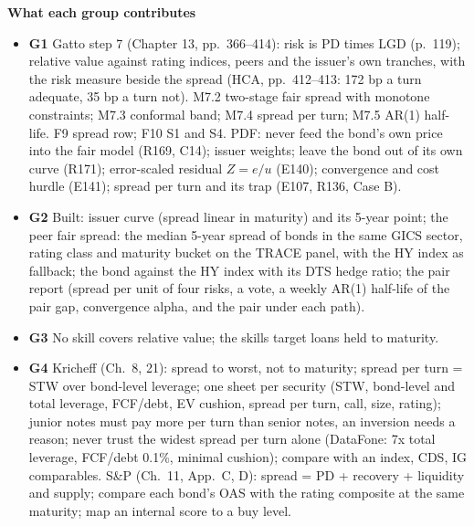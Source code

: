 \documentclass[11pt]{article}
\newcommand{\GA}{\textcolor{gA}{\textbf{G1}}}
\newcommand{\GB}{\textcolor{gB}{\textbf{G2}}}
\newcommand{\GC}{\textcolor{gC}{\textbf{G3}}}
\newcommand{\GD}{\textcolor{gD}{\textbf{G4}}}
\newcommand{\fld}[1]{\par\medskip\noindent\textbf{\textcolor{steel}{#1}}\par\nopagebreak}
\begin{document}
\fld{What each group contributes}
\begin{itemize}
\item \GA{} Gatto step 7 (Chapter 13, pp.~366--414): risk is PD times LGD (p.~119); relative value against rating indices, peers and the issuer's own tranches, with the risk measure beside the spread (HCA, pp.~412--413: 172 bp a turn adequate, 35 bp a turn not). M7.2 two-stage fair spread with monotone constraints; M7.3 conformal band; M7.4 spread per turn; M7.5 AR(1) half-life. F9 spread row; F10 S1 and S4. PDF: never feed the bond's own price into the fair model (R169, C14); issuer weights; leave the bond out of its own curve (R171); error-scaled residual $Z = e/u$ (E140); convergence and cost hurdle (E141); spread per turn and its trap (E107, R136, Case B).
\item \GB{} Built: issuer curve (spread linear in maturity) and its 5-year point; the peer fair spread: the median 5-year spread of bonds in the same GICS sector, rating class and maturity bucket on the TRACE panel, with the HY index as fallback; the bond against the HY index with its DTS hedge ratio; the pair report (spread per unit of four risks, a vote, a weekly AR(1) half-life of the pair gap, convergence alpha, and the pair under each path).
\item \GC{} No skill covers relative value; the skills target loans held to maturity.
\item \GD{} Kricheff (Ch.~8, 21): spread to worst, not to maturity; spread per turn = STW over bond-level leverage; one sheet per security (STW, bond-level and total leverage, FCF/debt, EV cushion, spread per turn, call, size, rating); junior notes must pay more per turn than senior notes, an inversion needs a reason; never trust the widest spread per turn alone (DataFone: 7x total leverage, FCF/debt 0.1\%, minimal cushion); compare with an index, CDS, IG comparables. S\&P (Ch.~11, App.~C, D): spread = PD + recovery + liquidity and supply; compare each bond's OAS with the rating composite at the same maturity; map an internal score to a buy level.
\end{itemize}
\end{document}
